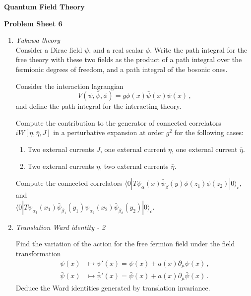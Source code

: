 \documentclass[12pt,a4paper]{article}
\newcommand{\psibar}{\bar{\psi}}
\newcommand{\etabar}{\bar{\eta}}
\begin{document}
\begin{center}
{\bf Quantum Field Theory}\\[\baselineskip]
\end{center}
{\bf Problem Sheet 6}

\begin{enumerate}
  \item {\it Yukawa theory} \\
    
    Consider a Dirac field $\psi$, and a real scalar $\phi$. Write the
    path integral for the free theory with these two fields as the
    product of a path integral over the fermionic degrees of freedom,
    and a path integral of the bosonic ones. 

    Consider the interaction lagrangian
    \[
    V(\psi,\psibar,\phi) = g \phi(x) \psibar(x) \psi(x)\, ,
    \]
    and define the path integral for the interacting theory. 

    Compute the contribution to the generator of connected correlators
    $iW[\eta,\etabar, J]$ in a perturbative expansion at order $g^2$
    for the following cases:
    \begin{enumerate}
    \item Two external currents $J$, one external current $\eta$, one
      external current $\etabar$.
    \item Two external currents $\eta$, two
      external currents $\etabar$.
    \end{enumerate}
    
    Compute the connected correlators
    $\langle 0 | T \psi_\alpha(x) \psibar_\beta(y) \phi(z_1)
    \phi(z_2)| 0 \rangle_c$,
    and \\
    $\langle 0 | T \psi_{\alpha_1}(x_1) \psibar_{\beta_1}(y_1)
    \psi_{\alpha_2}(x_2) \psibar_{\beta_2}(y_2) |0\rangle_c$.

    \bigskip

  \item {\it Translation Ward identity - 2}
    
    Find the variation of the action for the free fermion field under
    the field transformation
    \begin{align*}
    \psi(x) &\mapsto \psi'(x) = \psi(x) + a(x) \partial_\mu \psi(x)\,
              , \\
    \psibar(x) &\mapsto \psibar'(x) = \psibar(x) + a(x) \partial_\mu \psibar(x)\,
              .
    \end{align*}
    Deduce the Ward identities generated by translation invariance. 


\end{enumerate}
\end{document}
